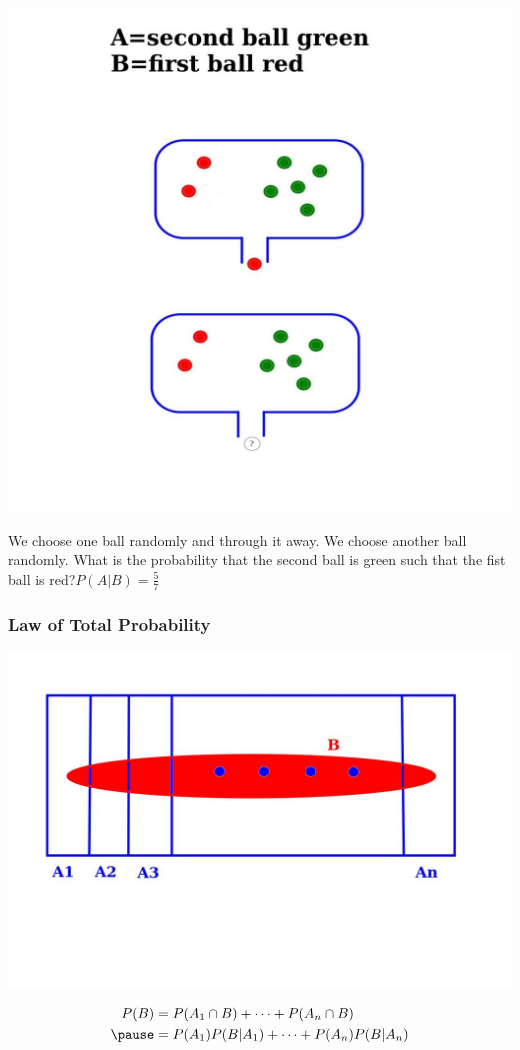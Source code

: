 \documentclass[12pt,aspectratio=169]{beamer}
\begin{document}
\begin{frame}
\begin{center}
\includegraphics[scale=0.23]{balls2}
\end{center}\pause
We choose one ball randomly and through it away. We choose another ball randomly. What is the probability that the second ball is green such that the fist ball is red?\pause $P(A|B)=\frac{5}{7}$

\end{frame}

\begin{frame}
\frametitle{Law of Total Probability}
\begin{center}
\includegraphics[scale=0.25]{balls4}
\end{center}\pause
\[
\begin{aligned}
P(B)&=P(A_1\cap B)+\dots +P(A_n\cap B)\\ \pause
&=P(A_1)P(B|A_1)+\dots+P(A_n)P(B|A_n)
\end{aligned}
\]
\end{frame}
\end{document}
